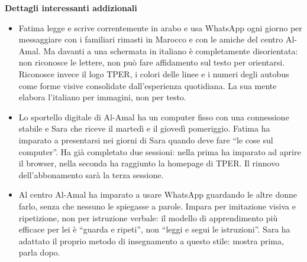 \documentclass[11pt,a4paper]{article}
\begin{document}
\begin{center}
\vspace{0.3cm}



\begin{tcolorbox}[colback=backgroundColor!50,colframe=borderColor,arc=2mm]
    \textbf{Dettagli interessanti addizionali} \\[4pt]
    {\small
    \begin{itemize}[leftmargin=*]
        \item Fatima legge e scrive correntemente in arabo
        e usa WhatsApp ogni giorno per messaggiare con
        i familiari rimasti in Marocco e con le amiche
        del centro Al-Amal. Ma davanti a una schermata
        in italiano è completamente disorientata:
        non riconosce le lettere, non può fare affidamento
        sul testo per orientarsi. Riconosce invece il logo
        TPER, i colori delle linee e i numeri degli autobus
        come forme visive consolidate dall'esperienza
        quotidiana. La sua mente elabora l'italiano
        per immagini, non per testo.

        \item Lo sportello digitale di Al-Amal ha un
        computer fisso con una connessione stabile e
        Sara che riceve il martedì e il giovedì pomeriggio.
        Fatima ha imparato a presentarsi nei giorni
        di Sara quando deve fare ``le cose sul computer''.
        Ha già completato due sessioni: nella prima
        ha imparato ad aprire il browser, nella seconda
        ha raggiunto la homepage di TPER. Il rinnovo
        dell'abbonamento sarà la terza sessione.

        \item Al centro Al-Amal ha imparato a usare
        WhatsApp guardando le altre donne farlo,
        senza che nessuno le spiegasse a parole.
        Impara per imitazione visiva e ripetizione,
        non per istruzione verbale: il modello di
        apprendimento più efficace per lei è
        ``guarda e ripeti'', non ``leggi e segui
        le istruzioni''. Sara ha adattato
        il proprio metodo di insegnamento
        a questo stile: mostra prima, parla dopo.


\end{itemize}}
\end{tcolorbox}
\end{center}
\end{document}
